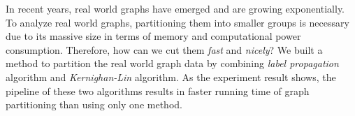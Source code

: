 In recent years, real world graphs have emerged and are growing exponentially. To analyze real world graphs, partitioning them into smaller groups is necessary due to its massive size in terms of memory and computational power consumption. Therefore, how can we cut them \textit{fast} and \textit{nicely}? We built a method to partition the real world graph data by combining \textit{label propagation} algorithm and \textit{Kernighan-Lin} algorithm. As the experiment result shows, the pipeline of these two algorithms results in faster running time of graph partitioning than using only one method.